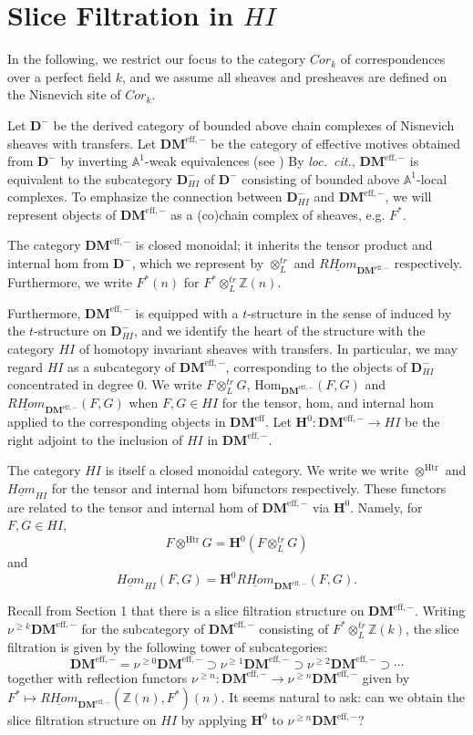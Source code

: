 \documentclass[11pt]{amsart}
\numberwithin{equation}{section}
\theoremstyle{plain} %
\theoremstyle{definition}
\newcommand{\D}{\mathbf{D}}
\newcommand{\DM}{\mathbf{DM}^{\mathrm{eff}}}
\newcommand{\DMm}{\mathbf{DM}^{\mathrm{eff},-}}
\newcommand{\A}{\mathbb{A}^1}
\newcommand{\HI}{HI}
\newcommand{\tDM}{\otimes_{L}^{tr}}
\newcommand{\homDM}{\mathrm{Hom}_{\DMm}}
\newcommand{\rhomDM}{\underline{RHom}_{\DMm}}
\renewcommand{\H}{\mathbf{H}}
\newcommand{\tHI}{\otimes^{\mathrm{Htr}}}
\newcommand{\ihomHI}{\underline{Hom}_{\HI}}
\newcommand{\Z}{\mathbb{Z}}
\newcommand{\slice}[1]{\nu^{#1}}
\begin{document}
\section{Slice Filtration in $\HI$}

\noindent In the following, we restrict our focus to the category 
$Cor_k$ of correspondences over a perfect field $k$, and we assume 
all sheaves and presheaves are defined on the Nisnevich site of 
$Cor_k$.

Let $\D^-$ be the derived category of bounded above chain 
complexes of Nisnevich sheaves with transfers. Let $\DMm$ be
the category of effective motives obtained from $\D^-$ by 
inverting $\A$-weak equivalences (see \cite{MVW}) By \emph{loc.\ cit.}, $\DMm$ is 
equivalent to the subcategory $\D_{\HI}^-$ of $\D^-$ consisting of 
bounded above $\A$-local complexes. To emphasize the connection
between $\D_{\HI}^-$ and $\DMm$, we will represent objects of
$\DMm$ as a (co)chain complex of sheaves, e.g. $F^*$.

The category $\DMm$ is closed monoidal; it inherits the tensor
product and internal hom from $\D^-$, which we represent by
$\tDM$ and $\rhomDM$ respectively. Furthermore, we write $F^*(n)$ for
$F^* \tDM \Z(n)$.

Furthermore, $\DMm$ is equipped with a $t$-structure in the sense 
of \cite{BBD} induced by the $t$-structure on $\D_{\HI}^-$, and 
we identify the heart of the structure with the category $\HI$ of 
homotopy invariant sheaves with transfers. In particular, we may 
regard $\HI$ as a subcategory of $\DMm$, corresponding to the 
objects of $\D_{\HI}^-$ concentrated in degree 0. We write $F 
\tDM G$, $\homDM(F, G)$ and $\rhomDM(F, G)$ when $F, G \in \HI$ 
for the tensor, hom, and internal hom applied to the 
corresponding objects in $\DM$. Let $\H^0 : \DMm \rightarrow \HI$ 
be the right adjoint to the inclusion of $\HI$ in $\DMm$.

The category $\HI$ is itself a closed monoidal category. We write 
we write $\tHI$ and $\ihomHI$ for the tensor and internal hom 
bifunctors respectively. These functors are related to the tensor 
and internal hom of $\DMm$ via $\H^0$. Namely, for $F, G \in \HI$,
\[
F \tHI G = \H^0(F \tDM G)
\] 
and 
\[
\ihomHI(F, G) = \H^0\rhomDM(F, G).
\]

Recall from \cite{HuKa} Section 1 that there is a slice 
filtration structure on $\DMm$. Writing $\slice{\geq k}\DMm$ for 
the subcategory of $\DMm$ consisting of $F^* \tDM \Z(k)$, the 
slice filtration is given by the following tower of subcategories: 
\[
\DMm = \slice{\geq 0}\DMm \supset \slice{\geq 1}\DMm
\supset \slice{\geq 2}\DMm \supset \cdots
\]
together with reflection functors $\slice{\geq n}: \DMm 
\longrightarrow \slice{\geq n}\DMm$ given by $F^* \mapsto 
\rhomDM(\Z(n), F^*)(n)$. It seems natural to ask: can we obtain 
the slice filtration structure on $\HI$ by applying $\H^0$ to 
$\slice{\geq n} \DMm$? 
\end{document}
